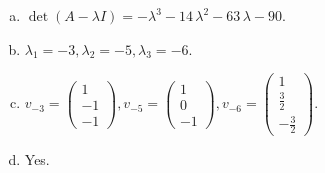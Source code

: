 \begin{questions}
\begin{solution}
\begin{enumerate}[(a)]
\item $\det(A-\lambda I)=-{\lambda}^{3} - 14 \, {\lambda}^{2} - 63 \, {\lambda} - 90$.
\item ${\lambda}_1=-3, {\lambda}_2=-5, {\lambda}_3=-6$.
\item $v_{-3}=\left(\begin{array}{r}
1 \\
-1 \\
-1
\end{array}\right), v_{-5}=\left(\begin{array}{r}
1 \\
0 \\
-1
\end{array}\right), v_{-6}=\left(\begin{array}{r}
1 \\
\frac{3}{2} \\
-\frac{3}{2}
\end{array}\right)$.
\item Yes.
\end{enumerate}
\end{solution}

\end{questions}

\newpage


\begin{center}
\end{center}

